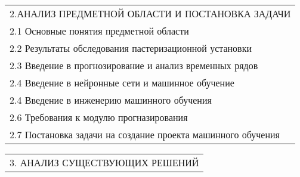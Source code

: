 \documentclass[12pt, А4, twoside]{article} %
\begin{document}
\begin{FlushLeft}
    \begin{tabular}{p{17.25cm}}
        \textsf{2.АНАЛИЗ ПРЕДМЕТНОЙ ОБЛАСТИ И ПОСТАНОВКА ЗАДАЧИ} \vspace{1pt} \hline \\
        \hspace{0.3cm}\textsf{2.1 Основные понятия предметной области} \vspace{1pt} \hline \\
        \hspace{0.3cm}\textsf{2.2 Результаты обследования пастеризационной установки} \vspace{1pt} \hline \\
        \hspace{0.3cm}\textsf{2.3 Введение в прогнозирование и анализ временных рядов} \vspace{1pt} \hline \\
        \hspace{0.3cm}\textsf{2.4 Введение в нейронные сети и машинное обучение} \vspace{1pt} \hline \\
        \hspace{0.3cm}\textsf{2.4 Введение в инженерию машинного обучения} \vspace{1pt} \hline \\
        \hspace{0.3cm}\textsf{2.6 Требования к модулю прогназирования} \vspace{1pt} \hline \\
        \hspace{0.3cm}\textsf{2.7 Постановка задачи на создание проекта машинного обучения} \vspace{1pt} \hline \\
    \end{tabular}  

    \begin{tabular}{p{17.25cm}} 
        \textsf{3. АНАЛИЗ СУЩЕСТВУЮЩИХ РЕШЕНИЙ} \vspace{1pt} \hline \\
    \end{tabular} 


\end{FlushLeft}
\end{document}
